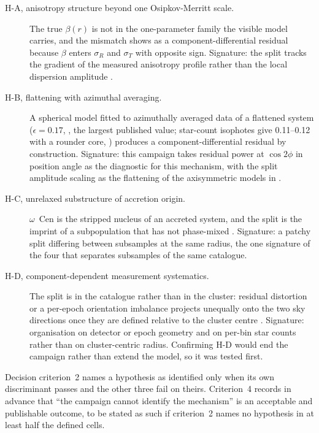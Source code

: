 \documentclass[11pt]{article}
\newcommand{\ocen}{$\omega$~Cen}
\begin{document}
\begin{description}
\item[H-A, anisotropy structure beyond one Osipkov-Merritt scale.] The true $\beta(r)$ is not in the one-parameter family the visible model carries, and the mismatch shows as a component-differential residual because $\beta$ enters $\sigma_R$ and $\sigma_T$ with opposite sign. Signature: the split tracks the gradient of the measured anisotropy profile rather than the local dispersion amplitude \citep{Zocchi2017,Zocchi2019,Aros2020}.
\item[H-B, flattening with azimuthal averaging.] A spherical model fitted to azimuthally averaged data of a flattened system ($\epsilon = 0.17$, \citealt{WhiteShawl1987}, the largest published value; star-count isophotes give 0.11--0.12 with a rounder core, \citealt{Geyer1983,Pancino2003}) produces a component-differential residual by construction. Signature: this campaign takes residual power at $\cos 2\phi$ in position angle as the diagnostic for this mechanism, with the split amplitude scaling as the flattening of the axisymmetric models in \citep{vanderMarelAnderson2010}.
\item[H-C, unrelaxed substructure of accretion origin.] \ocen{} is the stripped nucleus of an accreted system, and the split is the imprint of a subpopulation that has not phase-mixed \citep{Ibata2019,BekkiTsujimoto2019,Clontz2024}. Signature: a patchy split differing between subsamples at the same radius, the one signature of the four that separates subsamples of the same catalogue.
\item[H-D, component-dependent measurement systematics.] The split is in the catalogue rather than in the cluster: residual distortion or a per-epoch orientation imbalance projects unequally onto the two sky directions once they are defined relative to the cluster centre \citep{Haberle2024oMEGACatII,Haberle2025oMEGACatVI}. Signature: organisation on detector or epoch geometry and on per-bin star counts rather than on cluster-centric radius. Confirming H-D would end the campaign rather than extend the model, so it was tested first.
\end{description}

Decision criterion~2 names a hypothesis as identified only when its own discriminant passes and the other three fail on theirs. Criterion~4 records in advance that ``the campaign cannot identify the mechanism'' is an acceptable and publishable outcome, to be stated as such if criterion~2 names no hypothesis in at least half the defined cells.
\end{document}
